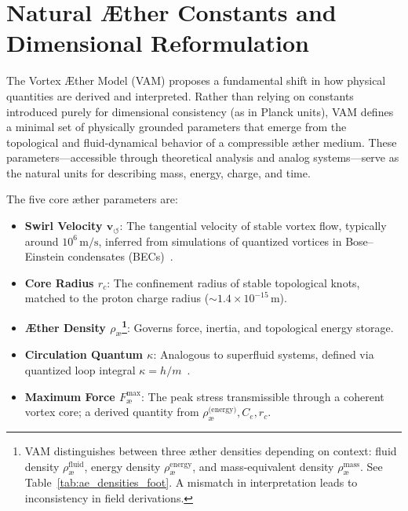 \section{Natural Æther Constants and Dimensional Reformulation}

The Vortex Æther Model (VAM) proposes a fundamental shift in how physical quantities are derived and interpreted. Rather than relying on constants introduced purely for dimensional consistency (as in Planck units), VAM defines a minimal set of physically grounded parameters that emerge from the topological and fluid-dynamical behavior of a compressible æther medium. These parameters—accessible through theoretical analysis and analog systems—serve as the natural units for describing mass, energy, charge, and time.

The five core æther parameters are:

\begin{itemize}
    \item \textbf{Swirl Velocity \( \mathbf{v}_{\scriptscriptstyle\boldsymbol{\circlearrowleft}} \)}: The tangential velocity of stable vortex flow, typically around \( 10^6 \, \text{m/s} \), inferred from simulations of quantized vortices in Bose–Einstein condensates (BECs)~\cite{Pethick2008BEC, Kleckner2013KnottedVortices}.

    \item \textbf{Core Radius \( r_c \)}: The confinement radius of stable topological knots, matched to the proton charge radius (\( \sim 1.4 \times 10^{-15} \, \text{m} \)).

    \item \textbf{Æther Density \( \rho_\text{\ae} \)\footnote{VAM distinguishes between three æther densities depending on context: fluid density \( \rho_\text{\ae}^{\text{fluid}} \), energy density \( \rho_\text{\ae}^{\text{energy}} \), and mass-equivalent density \( \rho_\text{\ae}^{\text{mass}} \). See Table~\ref{tab:ae_densities_foot}. A mismatch in interpretation leads to inconsistency in field derivations.}}: Governs force, inertia, and topological energy storage.

    \item \textbf{Circulation Quantum \( \kappa \)}: Analogous to superfluid systems, defined via quantized loop integral \( \kappa = h / m \)~\cite{Donnelly1991QuantizedVortices}.

    \item \textbf{Maximum Force \( F^{\text{max}}_{\text{\ae}} \)}: The peak stress transmissible through a coherent vortex core; a derived quantity from \( \rho_\text{\ae}^{\text{(energy)}}, C_e, r_c \).
\end{itemize}

